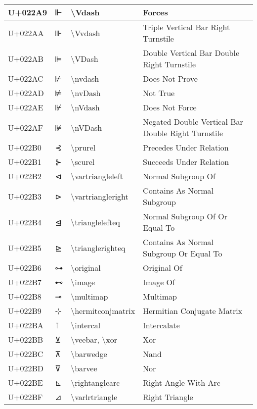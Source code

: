 \begin{table}[h]
\begin{tabulary}{\linewidth}{|L|L|L|L|}
\hline
U+022A9 & ⊩ & {\textbackslash}Vdash & Forces \\
\hline
U+022AA & ⊪ & {\textbackslash}Vvdash & Triple Vertical Bar Right Turnstile \\
\hline
U+022AB & ⊫ & {\textbackslash}VDash & Double Vertical Bar Double Right Turnstile \\
\hline
U+022AC & ⊬ & {\textbackslash}nvdash & Does Not Prove \\
\hline
U+022AD & ⊭ & {\textbackslash}nvDash & Not True \\
\hline
U+022AE & ⊮ & {\textbackslash}nVdash & Does Not Force \\
\hline
U+022AF & ⊯ & {\textbackslash}nVDash & Negated Double Vertical Bar Double Right Turnstile \\
\hline
U+022B0 & ⊰ & {\textbackslash}prurel & Precedes Under Relation \\
\hline
U+022B1 & ⊱ & {\textbackslash}scurel & Succeeds Under Relation \\
\hline
U+022B2 & ⊲ & {\textbackslash}vartriangleleft & Normal Subgroup Of \\
\hline
U+022B3 & ⊳ & {\textbackslash}vartriangleright & Contains As Normal Subgroup \\
\hline
U+022B4 & ⊴ & {\textbackslash}trianglelefteq & Normal Subgroup Of Or Equal To \\
\hline
U+022B5 & ⊵ & {\textbackslash}trianglerighteq & Contains As Normal Subgroup Or Equal To \\
\hline
U+022B6 & ⊶ & {\textbackslash}original & Original Of \\
\hline
U+022B7 & ⊷ & {\textbackslash}image & Image Of \\
\hline
U+022B8 & ⊸ & {\textbackslash}multimap & Multimap \\
\hline
U+022B9 & ⊹ & {\textbackslash}hermitconjmatrix & Hermitian Conjugate Matrix \\
\hline
U+022BA & ⊺ & {\textbackslash}intercal & Intercalate \\
\hline
U+022BB & ⊻ & {\textbackslash}veebar, {\textbackslash}xor & Xor \\
\hline
U+022BC & ⊼ & {\textbackslash}barwedge & Nand \\
\hline
U+022BD & ⊽ & {\textbackslash}barvee & Nor \\
\hline
U+022BE & ⊾ & {\textbackslash}rightanglearc & Right Angle With Arc \\
\hline
U+022BF & ⊿ & {\textbackslash}varlrtriangle & Right Triangle \\
\hline

\end{tabulary}
\end{table}
